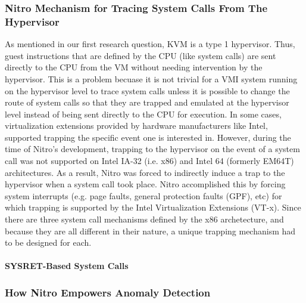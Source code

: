 \documentclass{report}
\begin{document}
\begin{spacing}{1.5}
\subsubsection{Nitro Mechanism for Tracing System Calls From The Hypervisor}

{\large
As mentioned in our first research question, KVM is a type 1 hypervisor. Thus, guest instructions that are defined by the CPU (like system calls) are sent directly to the CPU from the VM without needing intervention by the hypervisor. This is a problem  becuase it is not trivial for a VMI system running on the hypervisor level to trace system calls unless it is possible to change the route of system calls so that they are trapped and emulated at the hypervisor level instead of being sent directly to the CPU for execution. In some cases, virtualization extensions provided by hardware manufacturers like Intel, supported trapping the specific event one is interested in. However, during the time of Nitro's development, trapping to the hypervisor on the event of a system call was not supported on Intel IA-32 (i.e. x86) and Intel 64 (formerly EM64T) architectures. As a result, Nitro was forced to indirectly induce a trap to the hypervisor when a system call took place. Nitro accomplished this by forcing system interrupts (e.g. page faults, general protection faults (GPF), etc) for which trapping is supported by the Intel Virtualization Extensions (VT-x). Since there are three system call mechanisms defined by the x86 archetecture, and because they are all different in their nature, a unique trapping mechanism had to be designed for each.
\newline
}


\paragraph{SYSRET-Based System Calls}

{\large

\newline
}







\subsubsection{How Nitro Empowers Anomaly Detection}


\end{spacing}
\end{document}
